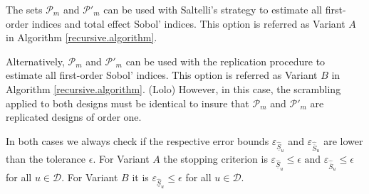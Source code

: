 \bigskip

The sets $\mathcal{P}_{m}$ and $\mathcal{P}'_{m}$ can be used with Saltelli's strategy to estimate all first-order indices and total effect Sobol' indices. This option is referred as Variant $A$ in Algorithm \ref{recursive.algorithm}.

Alternatively, $\mathcal{P}_{m}$ and $\mathcal{P}'_{m}$ can be used with the replication procedure to estimate all first-order Sobol' indices. This option is referred as Variant $B$ in Algorithm \ref{recursive.algorithm}. {\color{purple} (Lolo) However, in this case, the scrambling applied to both designs must be identical to insure that $\mathcal{P}_{m}$ and $\mathcal{P}'_{m}$ are replicated designs of order one.}

In both cases we always check if the respective error bounds $\varepsilon_{\widehat{\underline{S}}_u}$ and $\varepsilon_{\widehat{\overline{S}}_u}$ are lower than the tolerance $\epsilon$. For Variant $A$ the stopping criterion is $\varepsilon_{\widehat{\underline{S}}_u} \leq \epsilon \text{ and } \varepsilon_{\widehat{\overline{S}}_u} \leq \epsilon$ for all $ u \in \mathcal{D}$. For Variant $B$ it is $\varepsilon_{\widehat{\underline{S}}_u} \leq \epsilon$ for all $ u \in \mathcal{D}$. 

